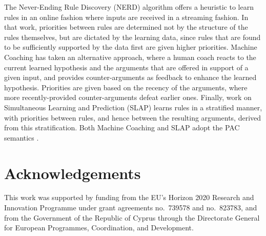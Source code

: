 The Never-Ending Rule Discovery (NERD) algorithm  offers a heuristic to learn rules in an online fashion where inputs are received in a streaming fashion. In that work, priorities between rules are determined not by the structure of the rules themselves, but are dictated by the learning data, since rules that are found to be sufficiently supported by the data first are given higher priorities. Machine Coaching  has taken an alternative approach, where a human coach reacts to the current learned hypothesis and the arguments that are offered in support of a given input, and provides counter-arguments as feedback to enhance the learned hypothesis. Priorities are given based on the recency of the arguments, where more recently-provided counter-arguments defeat earlier ones. Finally, work on Simultaneous Learning and Prediction (SLAP)  learns rules in a stratified manner, with priorities between rules, and hence between the resulting arguments, derived from this stratification. Both Machine Coaching  and SLAP  adopt the PAC semantics .
\section*{Acknowledgements}
This work was supported by funding from the EU's Horizon 2020 Research and Innovation Programme under grant agreements no.\ 739578 and no.\ 823783, and from the Government of the Republic of Cyprus through the Directorate General for European Programmes, Coordination, and Development.


